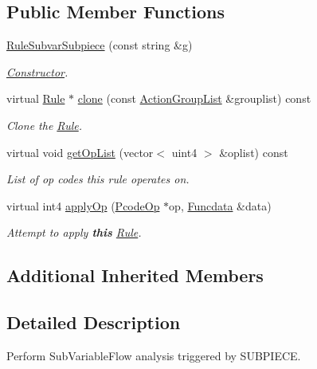\subsection*{Public Member Functions}
\begin{DoxyCompactItemize}
\item 
\mbox{\hyperlink{class_rule_subvar_subpiece_a5a2cc5ce7009e68b02f156cf68594138}{Rule\+Subvar\+Subpiece}} (const string \&g)
\begin{DoxyCompactList}\small\item\em \mbox{\hyperlink{class_constructor}{Constructor}}. \end{DoxyCompactList}\item 
virtual \mbox{\hyperlink{class_rule}{Rule}} $\ast$ \mbox{\hyperlink{class_rule_subvar_subpiece_aa771738e5e43bb05d600b22b7a6e191b}{clone}} (const \mbox{\hyperlink{class_action_group_list}{Action\+Group\+List}} \&grouplist) const
\begin{DoxyCompactList}\small\item\em Clone the \mbox{\hyperlink{class_rule}{Rule}}. \end{DoxyCompactList}\item 
virtual void \mbox{\hyperlink{class_rule_subvar_subpiece_a47aab430f3689d7fa4292ba78f8a799d}{get\+Op\+List}} (vector$<$ uint4 $>$ \&oplist) const
\begin{DoxyCompactList}\small\item\em List of op codes this rule operates on. \end{DoxyCompactList}\item 
virtual int4 \mbox{\hyperlink{class_rule_subvar_subpiece_aa55e18a43a85344e1e29c985d707a393}{apply\+Op}} (\mbox{\hyperlink{class_pcode_op}{Pcode\+Op}} $\ast$op, \mbox{\hyperlink{class_funcdata}{Funcdata}} \&data)
\begin{DoxyCompactList}\small\item\em Attempt to apply {\bfseries{this}} \mbox{\hyperlink{class_rule}{Rule}}. \end{DoxyCompactList}\end{DoxyCompactItemize}
\subsection*{Additional Inherited Members}


\subsection{Detailed Description}
Perform Sub\+Variable\+Flow analysis triggered by S\+U\+B\+P\+I\+E\+CE. 

